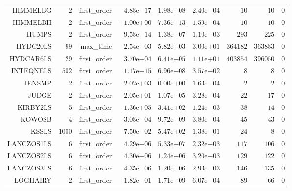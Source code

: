 \begin{longtable}{rrrrrrrrr}
HIMMELBG & \(     2\) & first\_order & \( 4.88\)e\(-17\) & \( 1.98\)e\(-08\) & \( 2.40\)e\(-04\) & \(    10\) & \(    10\) & \(     0\) \\
HIMMELBH & \(     2\) & first\_order & \(-1.00\)e\(+00\) & \( 7.36\)e\(-13\) & \( 1.59\)e\(-04\) & \(    10\) & \(    10\) & \(     0\) \\
HUMPS & \(     2\) & first\_order & \( 9.58\)e\(-14\) & \( 1.38\)e\(-07\) & \( 1.10\)e\(-03\) & \(   293\) & \(   225\) & \(     0\) \\
HYDC20LS & \(    99\) & max\_time & \( 2.54\)e\(-03\) & \( 5.82\)e\(-03\) & \( 3.00\)e\(+01\) & \(364182\) & \(363883\) & \(     0\) \\
HYDCAR6LS & \(    29\) & first\_order & \( 3.70\)e\(-04\) & \( 6.41\)e\(-05\) & \( 1.11\)e\(+01\) & \(403854\) & \(396050\) & \(     0\) \\
INTEQNELS & \(   502\) & first\_order & \( 1.17\)e\(-15\) & \( 6.96\)e\(-08\) & \( 3.57\)e\(-02\) & \(     8\) & \(     8\) & \(     0\) \\
JENSMP & \(     2\) & first\_order & \( 2.02\)e\(+03\) & \( 0.00\)e\(+00\) & \( 1.63\)e\(-04\) & \(     2\) & \(     2\) & \(     0\) \\
JUDGE & \(     2\) & first\_order & \( 2.05\)e\(+01\) & \( 1.07\)e\(-05\) & \( 3.28\)e\(-04\) & \(    22\) & \(    17\) & \(     0\) \\
KIRBY2LS & \(     5\) & first\_order & \( 1.36\)e\(+05\) & \( 3.41\)e\(+02\) & \( 1.24\)e\(-03\) & \(    38\) & \(    14\) & \(     0\) \\
KOWOSB & \(     4\) & first\_order & \( 3.08\)e\(-04\) & \( 9.72\)e\(-09\) & \( 3.80\)e\(-04\) & \(    45\) & \(    43\) & \(     0\) \\
KSSLS & \(  1000\) & first\_order & \( 7.50\)e\(-02\) & \( 5.47\)e\(+02\) & \( 1.38\)e\(-01\) & \(    24\) & \(     8\) & \(     0\) \\
LANCZOS1LS & \(     6\) & first\_order & \( 4.29\)e\(-06\) & \( 5.33\)e\(-07\) & \( 2.32\)e\(-03\) & \(   117\) & \(   106\) & \(     0\) \\
LANCZOS2LS & \(     6\) & first\_order & \( 4.30\)e\(-06\) & \( 1.24\)e\(-06\) & \( 3.20\)e\(-03\) & \(   129\) & \(   122\) & \(     0\) \\
LANCZOS3LS & \(     6\) & first\_order & \( 4.35\)e\(-06\) & \( 1.20\)e\(-06\) & \( 2.93\)e\(-03\) & \(   146\) & \(   135\) & \(     0\) \\
LOGHAIRY & \(     2\) & first\_order & \( 1.82\)e\(-01\) & \( 1.71\)e\(-09\) & \( 6.07\)e\(-04\) & \(    89\) & \(    66\) & \(     0\) \\

\end{longtable}

